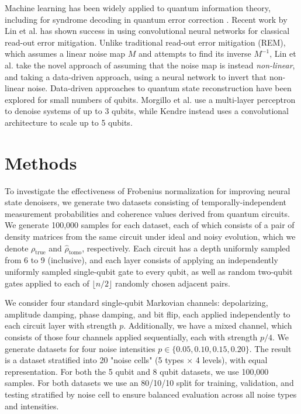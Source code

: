 \documentclass{ieeeqccl}
\begin{document}
Machine learning has been widely applied to quantum information theory, including for syndrome decoding in quantum error correction \autocite{wang2023transformerqecquantumerrorcorrection}.  Recent work by Lin et al. \autocite{linQuantumErrorMitigation2025} has shown success in using convolutional neural networks for classical read-out error mitigation.  Unlike traditional read-out error mitigation (REM), which assumes a linear noise map \(M\) and attempts to find its inverse \(M^{-1}\), Lin et al. take the novel approach of assuming that the noise map is instead \emph{non-linear}, and taking a data-driven approach, using a neural network to invert that non-linear noise.  Data-driven approaches to quantum state reconstruction have been explored for small numbers of qubits.  Morgillo et al. \autocite{Morgillo_2024} use a multi-layer perceptron to denoise systems of up to 3 qubits, while Kendre \autocite{kendre2025machinelearningquantumnoise} instead uses a convolutional architecture to scale up to 5 qubits. 

\section{Methods}
\label{sec:org8fa174b}
To investigate the effectiveness of Frobenius normalization for improving neural state denoisers, we generate two datasets consisting of temporally-independent measurement probabilities and coherence values derived from quantum circuits.  We generate 100,000 samples for each dataset, each of which consists of a pair of density matrices from the same circuit under ideal and noisy evolution, which we denote \(\rho_{\text{true}}\) and \(\hat{\rho}_{\text{tomo}}\), respectively.  Each circuit has a depth uniformly sampled from 6 to 9 (inclusive), and each layer consists of applying an independently uniformly sampled single-qubit gate to every qubit, as well as random two-qubit gates applied to each of \(\lfloor n/2 \rfloor\) randomly chosen adjacent pairs.

We consider four standard single-qubit Markovian channels: depolarizing, amplitude damping, phase damping, and bit flip, each applied independently to each circuit layer with strength \(p\).  Additionally, we have a mixed channel, which consists of those four channels applied sequentially, each with strength \(p/4\).  We generate datasets for four noise intensities \(p \in \{0.05, 0.10, 0.15, 0.20\}\).  The result is a dataset stratified into 20 "noise cells" (5 types \(\times\) 4 levels), with equal representation.  For both the 5 qubit and 8 qubit datasets, we use 100,000 samples.  For both datasets we use an 80/10/10 split for training, validation, and testing stratified by noise cell to ensure balanced evaluation across all noise types and intensities.
\end{document}
